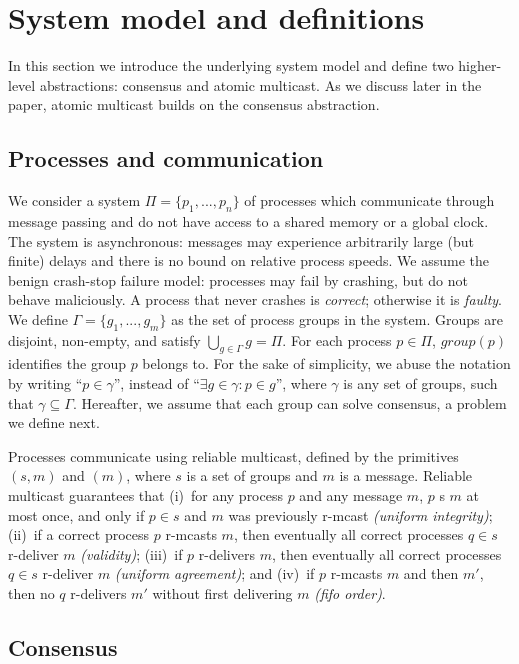 \documentclass[times, 10pt]{article}
\begin{document}
\section{System model and definitions}
\label{sec:model}

In this section we introduce the underlying system model and define two higher-level abstractions: consensus and atomic multicast. As we discuss later in the paper, atomic multicast builds on the consensus abstraction.

\subsection{Processes and communication}

We consider a system $\Pi = \{ p_1, ..., p_n \}$ of processes which communicate through message passing and do not have access to a shared memory or a global clock. The system is asynchronous: messages may experience arbitrarily large (but finite) delays and there is no bound on relative process speeds. We assume the benign crash-stop failure model: processes may fail by crashing, but do not behave maliciously. A process that never crashes is \emph{correct}; otherwise it is \emph{faulty}. We define $\Gamma = \{ g_1, ..., g_m \}$ as the set of process groups in the system. Groups are disjoint, non-empty, and satisfy $\bigcup_{g \in \Gamma} g = \Pi$. For each process $p \in \Pi$, $group(p)$ identifies the group $p$ belongs to. For the sake of simplicity, we abuse the notation by writing ``$p \in \gamma$'', instead of ``$\exists g \in \gamma: p \in g$'', where $\gamma$ is any set of groups, such that $\gamma \subseteq \Gamma$. Hereafter, we assume that each group can solve consensus, a problem we define next.

Processes communicate using reliable multicast, defined by the primitives \rmcast{}$(s,m)$ and \rmdel{}$(m)$, where $s$ is a set of groups and $m$ is a message. Reliable multicast guarantees that (i)~for any process $p$ and any message $m$, $p$ \rmdel{}s $m$ at most once, and only if $p \in s$ and $m$ was previously r-mcast \emph{(uniform integrity)}; (ii)~if a correct process $p$ r-mcasts $m$, then eventually all correct processes $q \in s$ r-deliver $m$ \emph{(validity)}; (iii)~if $p$ r-delivers $m$, then eventually all correct processes $q \in s$ r-deliver $m$ \emph{(uniform agreement)}; and (iv)~if $p$ r-mcasts $m$ and then $m'$, then no $q$ r-delivers $m'$ without first delivering $m$ \emph{(fifo order)}.


\subsection{Consensus}
\end{document}
